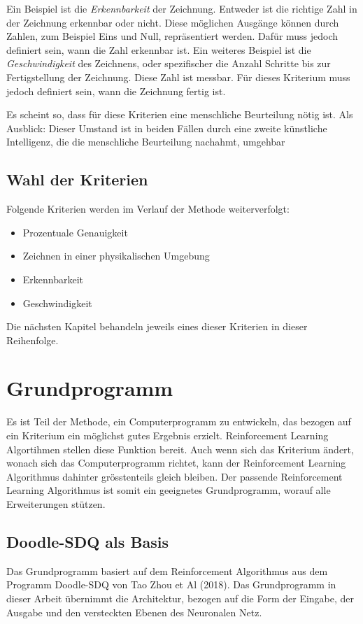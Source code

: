 Ein Beispiel ist die \emph{Erkennbarkeit} der Zeichnung. Entweder ist die
richtige Zahl in der Zeichnung erkennbar oder nicht. Diese möglichen Ausgänge
können durch Zahlen, zum Beispiel Eins und Null, repräsentiert werden. Dafür
muss jedoch definiert sein, wann die Zahl erkennbar ist. 
Ein weiteres Beispiel ist die \emph{Geschwindigkeit} des Zeichnens, oder
spezifischer die Anzahl Schritte bis zur Fertigstellung der Zeichnung. Diese
Zahl ist messbar. Für dieses Kriterium muss jedoch definiert sein, wann die
Zeichnung fertig ist. 

Es scheint so, dass für diese Kriterien eine menschliche Beurteilung nötig ist.
Als Ausblick: Dieser Umstand ist in beiden Fällen durch eine zweite
künstliche Intelligenz, die die menschliche Beurteilung nachahmt, umgehbar

\subsection*{Wahl der Kriterien}
Folgende Kriterien werden im Verlauf der Methode weiterverfolgt:

\begin{itemize}
  \item Prozentuale Genauigkeit
  \item Zeichnen in einer physikalischen Umgebung
  \item Erkennbarkeit 
  \item Geschwindigkeit
\end{itemize}

Die nächsten Kapitel behandeln jeweils eines dieser Kriterien in dieser Reihenfolge.

\section{Grundprogramm}
Es ist Teil der Methode, ein Computerprogramm zu entwickeln, das bezogen auf ein
Kriterium ein möglichst gutes Ergebnis erzielt. Reinforcement Learning
Algortihmen stellen diese Funktion bereit. Auch wenn sich das Kriterium ändert,
wonach sich das Computerprogramm richtet, kann der Reinforcement Learning
Algorithmus dahinter grösstenteils gleich bleiben. Der passende Reinforcement
Learning Algorithmus ist somit ein geeignetes Grundprogramm, worauf alle
Erweiterungen stützen. 

\subsection*{Doodle-SDQ als Basis}
Das Grundprogramm basiert auf dem Reinforcement Algorithmus aus dem Programm
Doodle-SDQ von Tao Zhou et Al (2018). Das Grundprogramm in dieser Arbeit
übernimmt die Architektur, bezogen auf die Form der Eingabe, der Ausgabe und den
versteckten Ebenen des Neuronalen Netz.

